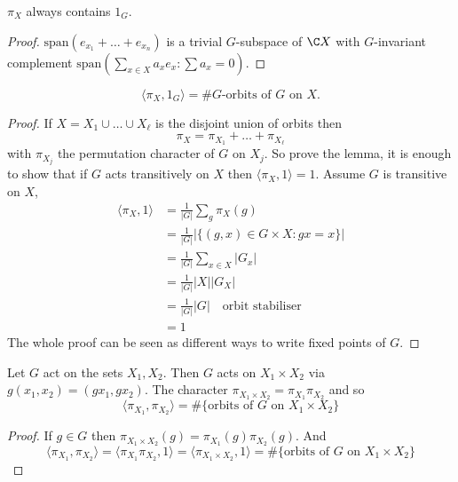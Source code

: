 \documentclass[a4paper]{article}
\begin{document}
\begin{lemma}
  \(\pi_X\) always contains \(1_G\).
\end{lemma}

\begin{proof}
  \(\text{span}(e_{x_1} + \dots + e_{x_n})\) is a trivial \(G\)-subspace of \(\C X\) with \(G\)-invariant complement \(\text{span}(\sum_{x \in X} a_x e_x: \sum a_x = 0)\).
\end{proof}

\begin{lemma}
  \[
    \langle \pi_X, 1_G \rangle = \# G\text{-orbits of \(G\) on \(X\)}.
  \]
\end{lemma}

\begin{proof}
  If \(X = X_1 \cup \dots \cup X_\ell\) is the disjoint union of orbits then
  \[
    \pi_X = \pi_{X_1} + \dots + \pi_{X_\ell}
  \]
  with \(\pi_{X_j}\) the permutation character of \(G\) on \(X_j\). So prove the lemma, it is enough to show that if \(G\) acts transitively on \(X\) then \(\langle \pi_X, 1 \rangle = 1\). Assume \(G\) is transitive on \(X\),
  \begin{align*}
    \langle \pi_X, 1 \rangle
    &= \frac{1}{|G|} \sum_g \pi_X(g) \\
    &= \frac{1}{|G|} |\{(g, x) \in G \times X: gx = x\}| \\
    &= \frac{1}{|G|} \sum_{x \in X} |G_x| \\
    &= \frac{1}{|G|} |X| |G_X| \\
    &= \frac{1}{|G|} |G| \quad \text{orbit stabiliser} \\
    &= 1
  \end{align*}
  The whole proof can be seen as different ways to write fixed points of \(G\).
\end{proof}

\begin{lemma}
  Let \(G\) act on the sets \(X_1, X_2\). Then \(G\) acts on \(X_1 \times X_2\) via \(g(x_1, x_2) = (gx_1, gx_2)\). The character \(\pi_{X_1 \times X_2} = \pi_{X_1} \pi_{X_2}\) and so
  \[
    \langle \pi_{X_1}, \pi_{X_2} \rangle
    = \#\{\text{orbits of \(G\) on \(X_1 \times X_2\)}\}
  \]
\end{lemma}

\begin{proof}
  If \(g \in G\) then \(\pi_{X_1 \times X_2}(g) = \pi_{X_1}(g) \pi_{X_2}(g)\). And
  \[
    \langle \pi_{X_1}, \pi_{X_2} \rangle
    = \langle \pi_{X_1} \pi_{X_2}, 1 \rangle
    = \langle \pi_{X_1 \times X_2}, 1 \rangle
    = \#\{\text{orbits of \(G\) on \(X_1 \times X_2\)}\}
  \]
\end{proof}
\end{document}
